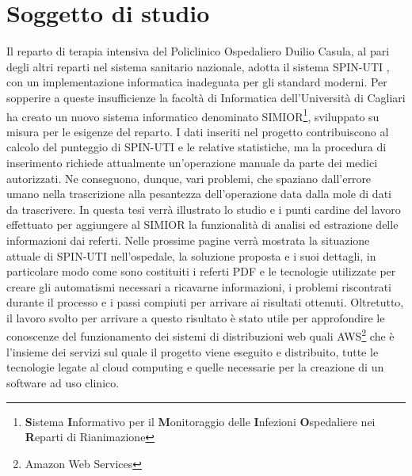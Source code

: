 \section{Soggetto di studio}
Il reparto di terapia intensiva del Policlinico Ospedaliero Duilio Casula, al pari degli altri reparti nel sistema sanitario nazionale, adotta il sistema SPIN-UTI , con un 
implementazione informatica inadeguata per gli standard moderni. Per sopperire a queste insufficienze la facoltà di Informatica dell'Università di Cagliari ha creato un nuovo sistema informatico denominato SIMIOR\footnote{\textbf{S}istema \textbf{I}nformativo per il \textbf{M}onitoraggio delle \textbf{I}nfezioni \textbf{O}spedaliere nei \textbf{R}eparti di Rianimazione}, sviluppato su misura per le esigenze del reparto. I dati inseriti nel progetto contribuiscono al calcolo del punteggio di SPIN-UTI e le relative statistiche, ma la procedura di inserimento richiede attualmente un'operazione manuale da parte dei medici autorizzati. Ne conseguono, dunque, vari problemi, che spaziano dall'errore umano nella trascrizione alla pesantezza dell'operazione data dalla mole di dati da trascrivere.
In questa tesi verrà illustrato lo studio e i punti cardine del lavoro effettuato per aggiungere al SIMIOR la funzionalità di analisi ed estrazione delle informazioni dai referti. Nelle prossime pagine verrà mostrata la situazione attuale di SPIN-UTI nell'ospedale, la soluzione proposta e i suoi dettagli, in particolare modo come sono costituiti i referti PDF e le tecnologie utilizzate per creare gli automatismi necessari a ricavarne informazioni, i problemi riscontrati durante il processo e i passi compiuti per arrivare ai risultati ottenuti.
Oltretutto, il lavoro svolto per arrivare a questo risultato è stato utile per approfondire le conoscenze del funzionamento dei sistemi di distribuzioni web quali AWS\footnote{Amazon Web Services} che è l'insieme dei servizi sul quale il progetto viene eseguito e distribuito, tutte le tecnologie legate al cloud computing e quelle necessarie per la creazione di un software ad uso clinico. 


